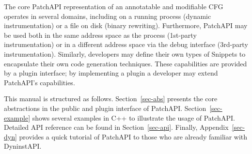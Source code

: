 The core PatchAPI representation of an annotatable and modifiable CFG
operates in several domains, including on a running process (dynamic
instrumentation) or a file on disk (binary rewriting). Furthermore,
PatchAPI may be used both in the same address space as the process
(1st-party instrumentation) or in a different address space via the
debug interface (3rd-party instrumentation). Similarly, developers may
define their own types of Snippets to encapsulate their own code
generation techniques. These capabilities are provided by a plugin
interface; by implementing a plugin a developer may extend PatchAPI's
capabilities.

This manual is structured as follows. Section~\ref{sec-abs} presents the core
abstractions in the public and plugin interface of
PatchAPI. Section~\ref{sec-example} shows several examples in C++ to illustrate the
usage of PatchAPI. Detailed API reference can be found in
Section~\ref{sec-api}. Finally, Appendix~\ref{sec-dyn} provides a quick tutorial
of PatchAPI to those who are already familiar with DyninstAPI.
